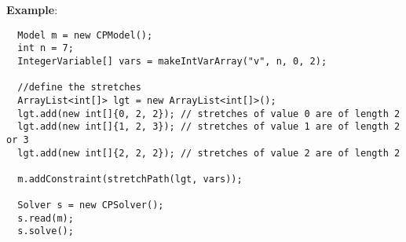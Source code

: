 \textbf{Example}:
\begin{lstlisting}
  Model m = new CPModel();
  int n = 7;
  IntegerVariable[] vars = makeIntVarArray("v", n, 0, 2);
	
  //define the stretches
  ArrayList<int[]> lgt = new ArrayList<int[]>();
  lgt.add(new int[]{0, 2, 2}); // stretches of value 0 are of length 2
  lgt.add(new int[]{1, 2, 3}); // stretches of value 1 are of length 2 or 3
  lgt.add(new int[]{2, 2, 2}); // stretches of value 2 are of length 2
	
  m.addConstraint(stretchPath(lgt, vars));
	
  Solver s = new CPSolver();
  s.read(m);
  s.solve();
\end{lstlisting}
